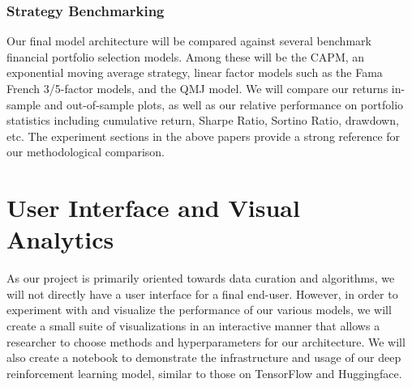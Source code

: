 \subsubsection{Strategy Benchmarking}

Our final model architecture will be compared against several benchmark financial portfolio selection 
models. Among these will be the CAPM, an exponential moving average strategy, linear factor models 
such as the Fama French 3/5-factor models, and the QMJ model. We will compare our returns 
in-sample and out-of-sample plots, as well as our relative performance on portfolio statistics 
including cumulative return, Sharpe Ratio, Sortino Ratio, drawdown, etc. The experiment sections 
in the above papers provide a strong reference for our methodological comparison.

\section{User Interface and Visual Analytics}

As our project is primarily oriented towards data curation and algorithms, we will not directly have a 
user interface for a final end-user. However, in order to experiment with and visualize the performance 
of our various models, we will create a small suite of visualizations in an interactive manner that 
allows a researcher to choose methods and hyperparameters for our architecture. We will also create a 
notebook to demonstrate the infrastructure and usage of our deep reinforcement learning model, 
similar to those on TensorFlow and Huggingface.
